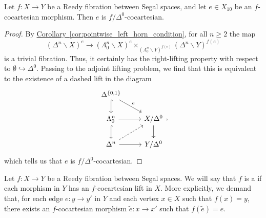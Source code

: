 \documentclass[main.tex]{subfiles}
\begin{document}
\begin{corollary}
  \label{cor:cocartesian_morphisms_are_first_row_cocartesian}
  Let $f\colon X \to Y$ be a Reedy fibration between Segal spaces, and let $e \in X_{10}$ be an $f$-cocartesian morphism. Then $e$ is $f / \Delta^{0}$-cocartesian.
\end{corollary}
\begin{proof}
  By \hyperref[cor:pointwise_left_horn_condition]{Corollary~\ref*{cor:pointwise_left_horn_condition}}, for all $n \geq 2$ the map
  \begin{equation*}
    (\Delta^{n} \backslash X)^{e} \to (\Lambda^{n}_{0} \backslash X)^{e} \times_{(\Lambda^{n}_{0} \backslash Y)^{f(e)}} (\Delta^{n} \backslash Y)^{f(e)}
  \end{equation*}
  is a trivial fibration. Thus, it certainly has the right-lifting property with respect to $\emptyset \hookrightarrow \Delta^{0}$. Passing to the adjoint lifting problem, we find that this is equivalent to the existence of a dashed lift in the diagram
  \begin{equation*}
    \begin{tikzcd}
      \Delta^{\{0, 1\}}
      \arrow[d, hook]
      \arrow[dr, "e"]
      \\
      \Lambda^{n}_{0}
      \arrow[r]
      \arrow[d, hook]
      & X / \Delta^{0}
      \arrow[d]
      \\
      \Delta^{n}
      \arrow[r]
      \arrow[ur, dashed]
      & Y / \Delta^{0}
    \end{tikzcd},
  \end{equation*}
  which tells us that $e$ is $f / \Delta^{0}$-cocartesian.
\end{proof}

\begin{definition}
  \label{def:cocartesian_fibration_between_complete_segal_spaces}
  Let $f\colon X \to Y$ be a Reedy fibration between Segal spaces. We will say that $f$ is a  if each morphism in $Y$ has an $f$-cocartesian lift in $X$. More explicitly, we demand that, for each edge $e\colon y \to y'$ in $Y$ and each vertex $x \in X$ such that $f(x) = y$, there exists an $f$-cocartesian morphism $\tilde{e}\colon x \to x'$ such that $f(\tilde{e}) = e$.
\end{definition}
\end{document}
